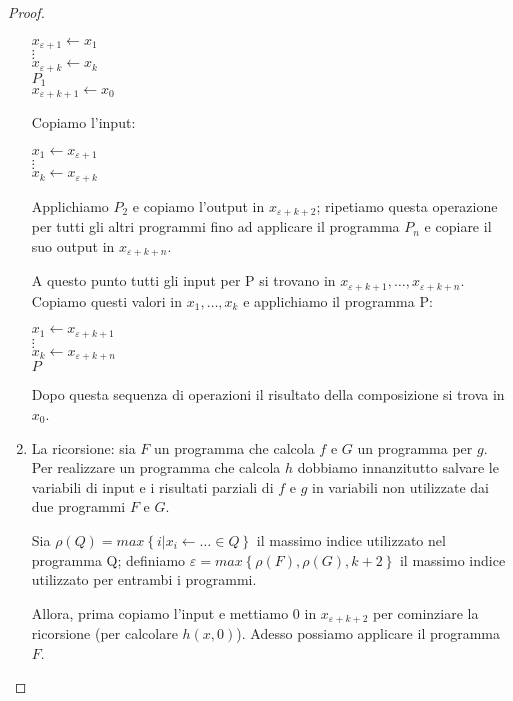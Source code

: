 \begin{proof}
\begin{enumerate}
\begin{mylisting}
$x_{\varepsilon+1}\leftarrow x_{1}$\\
$\vdots$\\
$x_{\varepsilon+k}\leftarrow x_{k}$\\
$P_{1}$\\
$x_{\varepsilon+k+1}\leftarrow x_{0}$
\end{mylisting}

Copiamo l'input:
\begin{mylisting}
$x_{1}\leftarrow x_{\varepsilon+1}$\\
$\vdots$\\
$x_{k}\leftarrow x_{\varepsilon+k}$
\end{mylisting}

Applichiamo $P_{2}$ e copiamo l'output in $x_{\varepsilon+k+2}$;
ripetiamo questa operazione per tutti gli altri programmi fino ad
applicare il programma $P_{n}$ e copiare il suo output in
$x_{\varepsilon+k+n}$.

A questo punto tutti gli input per P si trovano in
$x_{\varepsilon+k+1},\dots,x_{\varepsilon+k+n}$.  Copiamo questi
valori in $x_{1},\dots,x_{k}$ e applichiamo il programma P:

\begin{mylisting}
$x_{1}\leftarrow x_{\varepsilon+k+1}$\\
$\vdots$\\
$x_{k}\leftarrow x_{\varepsilon+k+n}$\\
$P$
\end{mylisting}

Dopo questa sequenza di operazioni il risultato della composizione si
trova in $x_{0}$.

\item La ricorsione: sia $F$ un programma che calcola $f$ e $G$ un
  programma per $g$. Per realizzare un programma che calcola $h$
  dobbiamo innanzitutto salvare le variabili di input e i risultati
  parziali di $f$ e $g$ in variabili non utilizzate dai due programmi
  $F$ e $G$.

  Sia $\rho(Q)=max\left\{ i|x_{i}\leftarrow\dots \in Q\right\}$ il
  massimo indice utilizzato nel programma Q; definiamo
  $\varepsilon=max\left\{ \rho(F),\rho(G),k+2\right\}$ il massimo
  indice utilizzato per entrambi i programmi.

Allora, prima copiamo l'input e mettiamo 0 in $x_{\varepsilon+k+2}$
per cominziare la ricorsione (per calcolare $h(x,0)$). Adesso possiamo
applicare il programma $F$.


\end{enumerate}
\end{proof}
